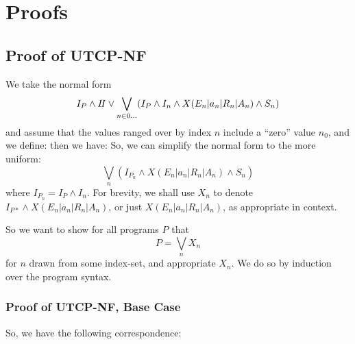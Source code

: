 \section{Proofs}\label{sec:proofs}

\subsection{Proof of \textsf{UTCP-NF}}

We take the normal form
\[
  I_P \land I\!I
      \lor
      \bigvee_{n \in 0\dots}
      (I_P \land I_n \land X(E_n|a_n|R_n|A_n) \land S_n)
\]
and  assume that the values ranged over by index $n$
include a ``zero'' value $n_0$,
and we define:
then we have:
So, we can simplify the normal form to the more uniform:
\[
\bigvee_n (I_{P_n} \land X(E_n|a_n|R_n|A_n) \land S_n)
\]
where $I_{P_n} = I_P \land I_n$.
For brevity, we shall use $X_n$ to denote $ I_{P*} \land X(E_n|a_n|R_n|A_n)$,
or just $X(E_n|a_n|R_n|A_n)$, as appropriate in context.

So we want to show for all programs $P$
that
\[
 P = \bigvee_n X_n
\]
for $n$ drawn from some index-set, and appropriate $X_n$.
We do so by induction over the program syntax.

\subsubsection{Proof of \textsf{UTCP-NF}, Base Case}

So, we have the following correspondence:

